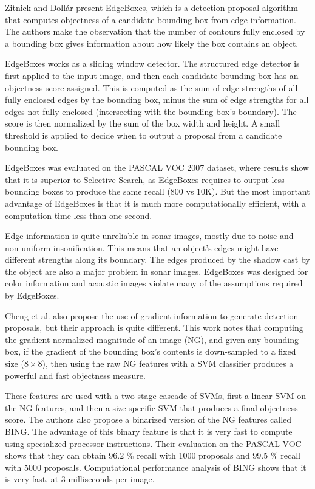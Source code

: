Zitnick and Dollár \cite{zitnick2014edge} present EdgeBoxes, which is a detection proposal algorithm that computes objectness of a candidate bounding box from edge information. The authors make the observation that the number of contours fully enclosed by a bounding box gives information about how likely the box contains an object.

EdgeBoxes works as a sliding window detector. The structured edge detector is first applied to the input image, and then each candidate bounding box has an objectness score assigned. This is computed as the sum of edge strengths of all fully enclosed edges by the bounding box, minus the sum of edge strengths for all edges not fully enclosed (intersecting with the bounding box's boundary). The score is then normalized by the sum of the box width and height. A small threshold is applied to decide when to output a proposal from a candidate bounding box.

EdgeBoxes was evaluated on the PASCAL VOC 2007 dataset, where results show that it is superior to Selective Search, as EdgeBoxes requires to output less bounding boxes to produce the same recall (800 vs 10K). But the most important advantage of EdgeBoxes is that it is much more computationally efficient, with a computation time less than one second.

Edge information is quite unreliable in sonar images, mostly due to noise and non-uniform insonification. This means that an object's edges might have different strengths along its boundary. The edges produced by the shadow cast by the object are also a major problem in sonar images. EdgeBoxes was designed for color information and acoustic images violate many of the assumptions required by EdgeBoxes.

Cheng et al. \cite{cheng2014bing} also propose the use of gradient information to generate detection proposals, but their approach is quite different. This work notes that computing the gradient normalized magnitude of an image (NG), and given any bounding box, if the gradient of the bounding box's contents is down-sampled to a fixed size ($8 \times 8$), then using the raw NG features with a SVM classifier produces a powerful and fast objectness measure.

These features are used with a two-stage cascade of SVMs, first a linear SVM on the NG features, and then a size-specific SVM that produces a final objectness score. The authors also propose a binarized version of the NG features called BING. The advantage of this binary feature is that it is very fast to compute using specialized processor instructions. Their evaluation on the PASCAL VOC shows that they can obtain $96.2$ \% recall with 1000 proposals and $99.5$ \% recall with 5000 proposals.
Computational performance analysis of BING shows that it is very fast, at 3 milliseconds per image.

